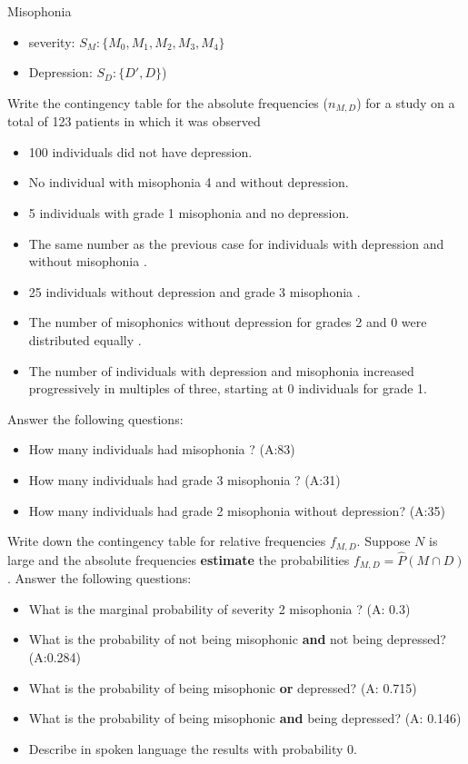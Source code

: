 \documentclass[
]{book}
\providecommand{\tightlist}{%
  \setlength{\itemsep}{0pt}\setlength{\parskip}{0pt}}
\begin{document}
Misophonia

\begin{itemize}
\tightlist
\item
  severity: \(S_M:\{M_ 0,M _1,M_2,M_3,M_4\}\)
\item
  Depression: \(S_ D:\{ D', D\}\))
\end{itemize}

Write the contingency table for the absolute frequencies (\(n_{ M,D }\)) for a study on a total of 123 patients in which it was observed

\begin{itemize}
\tightlist
\item
  100 individuals did not have depression.
\item
  No individual with misophonia 4 and without depression.
\item
  5 individuals with grade 1 misophonia and no depression.
\item
  The same number as the previous case for individuals with depression and without misophonia .
\item
  25 individuals without depression and grade 3 misophonia .
\item
  The number of misophonics without depression for grades 2 and 0 were distributed equally .
\item
  The number of individuals with depression and misophonia increased progressively
  in multiples of three, starting at 0 individuals for grade 1.
\end{itemize}

Answer the following questions:

\begin{itemize}
\tightlist
\item
  How many individuals had misophonia ? (A:83)
\item
  How many individuals had grade 3 misophonia ? (A:31)
\item
  How many individuals had grade 2 misophonia without depression? (A:35)
\end{itemize}

Write down the contingency table for relative frequencies \(f_{ M,D }\). Suppose \(N\) is large and the absolute frequencies \textbf{estimate} the probabilities \(f_{ M,D }=\hat {P}(M \cap D)\). Answer the following questions:

\begin{itemize}
\tightlist
\item
  What is the marginal probability of severity 2 misophonia ? (A: 0.3)
\item
  What is the probability of not being misophonic \textbf{and} not being depressed? (A:0.284)
\item
  What is the probability of being misophonic \textbf{or} depressed? (A: 0.715)
\item
  What is the probability of being misophonic \textbf{and} being depressed? (A: 0.146)
\item
  Describe in spoken language the results with probability 0.
\end{itemize}
\end{document}
